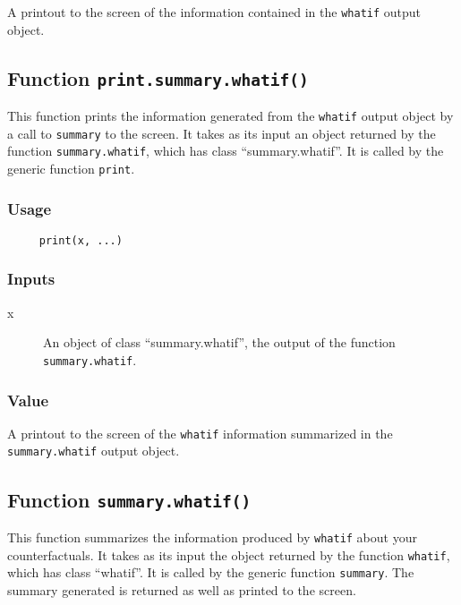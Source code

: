 \documentclass[oneside,letterpaper,titlepage]{article}
\begin{document}
A printout to the screen of the information contained in the 
\texttt{whatif} output object.

\subsection{Function \texttt{print.summary.whatif()}}

This function prints the information generated from the
\texttt{whatif} output object by a call to \texttt{summary} to the
screen.  It takes as its input an object returned by the function
\texttt{summary.whatif}, which has class ``summary.whatif''.  It is
called by the generic function \texttt{print}.

\subsubsection{Usage}

\begin{verbatim}
     print(x, ...)
\end{verbatim}

\subsubsection{Inputs}

\begin{description}
  \item[x]  An object of class ``summary.whatif'', the output of
    the function \texttt{summary.whatif}.
\end{description}

\subsubsection{Value}

A printout to the screen of the \texttt{whatif} information summarized
in the \texttt{summary.whatif} output object.

\subsection{Function \texttt{summary.whatif()}}

This function summarizes the information produced by \texttt{whatif}
about your counterfactuals.  It takes as its input the object returned
by the function \texttt{whatif}, which has class ``whatif''.  It is
called by the generic function \texttt{summary}.  The summary generated
is returned as well as printed to the screen.
\end{document}
